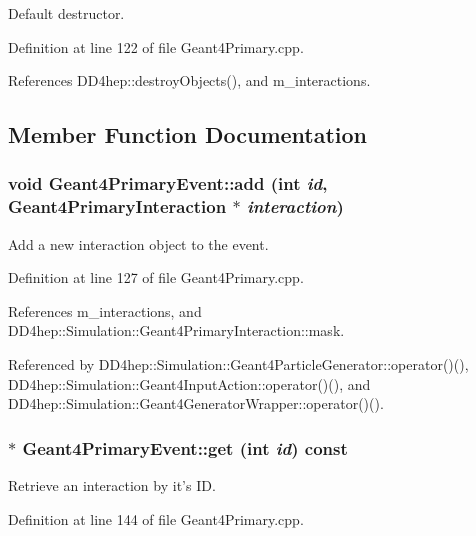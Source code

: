 Default destructor. 

Definition at line 122 of file Geant4Primary.cpp.

References DD4hep::destroyObjects(), and m\_\-interactions.

\subsection{Member Function Documentation}
\hypertarget{class_d_d4hep_1_1_simulation_1_1_geant4_primary_event_ae18431e26176abdd03ddbcd4b4097605}{
\subsubsection[{add}]{\setlength{\rightskip}{0pt plus 5cm}void Geant4PrimaryEvent::add (int {\em id}, \/  {\bf Geant4PrimaryInteraction} $\ast$ {\em interaction})}}
\label{class_d_d4hep_1_1_simulation_1_1_geant4_primary_event_ae18431e26176abdd03ddbcd4b4097605}


Add a new interaction object to the event. 

Definition at line 127 of file Geant4Primary.cpp.

References m\_\-interactions, and DD4hep::Simulation::Geant4PrimaryInteraction::mask.

Referenced by DD4hep::Simulation::Geant4ParticleGenerator::operator()(), DD4hep::Simulation::Geant4InputAction::operator()(), and DD4hep::Simulation::Geant4GeneratorWrapper::operator()().\hypertarget{class_d_d4hep_1_1_simulation_1_1_geant4_primary_event_a52c8d1a6663c926129ba5edf4e0fb401}{
\subsubsection[{get}]{ $\ast$ Geant4PrimaryEvent::get (int {\em id}) const}}
\label{class_d_d4hep_1_1_simulation_1_1_geant4_primary_event_a52c8d1a6663c926129ba5edf4e0fb401}


Retrieve an interaction by it's ID. 

Definition at line 144 of file Geant4Primary.cpp.

